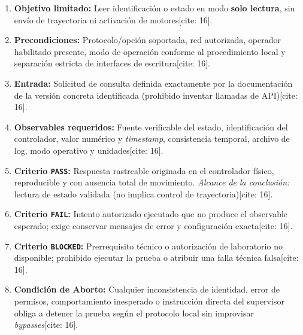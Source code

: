 \documentclass[11pt, a4paper]{article}
\begin{document}
\begin{tcolorbox}[colback=white, colframe=ucbblue, title=\textbf{Protocolo de 8 Puntos para el Ensayo Gate 1} {[cite: 16]}, left=2mm, right=2mm, top=1mm, bottom=1mm]
    \footnotesize\raggedright
    \begin{enumerate}
        \item \textbf{Objetivo limitado:} Leer identificación o estado en modo \textbf{solo lectura}, sin envío de trayectoria ni activación de motores[cite: 16].
        \item \textbf{Precondiciones:} Protocolo/opción soportada, red autorizada, operador habilitado presente, modo de operación conforme al procedimiento local y separación estricta de interfaces de escritura[cite: 16].
        \item \textbf{Entrada:} Solicitud de consulta definida exactamente por la documentación de la versión concreta identificada (prohibido inventar llamadas de API)[cite: 16].
        \item \textbf{Observables requeridos:} Fuente verificable del estado, identificación del controlador, valor numérico y \textit{timestamp}, consistencia temporal, archivo de log, modo operativo y unidades[cite: 16].
        \item \textbf{Criterio \texttt{PASS}:} Respuesta rastreable originada en el controlador físico, reproducible y con ausencia total de movimiento. \textit{Alcance de la conclusión:} lectura de estado validada (no implica control de trayectoria)[cite: 16].
        \item \textbf{Criterio \texttt{FAIL}:} Intento autorizado ejecutado que no produce el observable esperado; exige conservar mensajes de error y configuración exacta[cite: 16].
        \item \textbf{Criterio \texttt{BLOCKED}:} Prerrequisito técnico o autorización de laboratorio no disponible; prohibido ejecutar la prueba o atribuir una falla técnica falsa[cite: 16].
        \item \textbf{Condición de Aborto:} Cualquier inconsistencia de identidad, error de permisos, comportamiento inesperado o instrucción directa del supervisor obliga a detener la prueba según el protocolo local sin improvisar \textit{bypasses}[cite: 16].
    \end{enumerate}
\end{tcolorbox}
\end{document}
